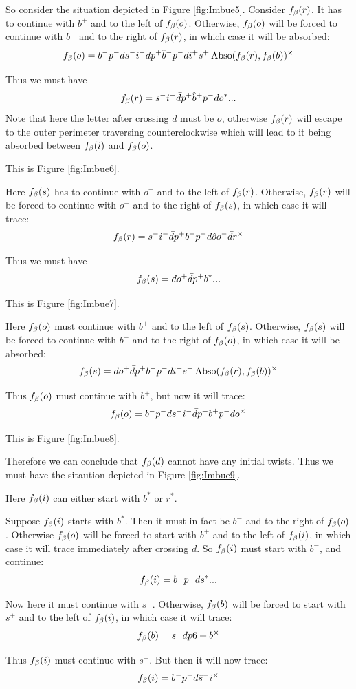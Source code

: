 So consider the situation depicted in Figure \ref{fig:Imbue5}. Consider $f_\beta(r)$. It has to continue with $b^+$ and to the left of $f_\beta(o)$. Otherwise, $f_\beta(o)$ will be forced to continue with $b^-$ and to the right of $f_\beta(r)$, in which case it will be absorbed:
\[
f_\beta(o) = b^- p^- d s^- i^-\bar{d} p^+ \hat{b}^- p^- d i^+ s^+ \operatorname{Abso}(f_\beta(r), f_\beta(b))^\times
\]

Thus we must have
\[
f_\beta(r) = s^- i^- \bar{d} p^+ \hat{b}^+ p^- d o^*...
\]
Note that here the letter after crossing $d$ must be $o$, otherwise $f_\beta(r)$ will escape to the outer perimeter traversing counterclockwise which will lead to it being absorbed between $f_\beta(i)$ and $f_\beta(o)$.

This is Figure \ref{fig:Imbue6}.

Here $f_\beta(s)$ has to continue with $o^+$ and to the left of $f_\beta(r)$. Otherwise, $f_\beta(r)$ will be forced to continue with $o^-$ and to the right of $f_\beta(s)$, in which case it will trace:
\[
f_\beta(r) = s^- i^- \bar{d} p^+ b^+ p^- d \hat{o}{o}^- \bar{d} r^\times
\]

Thus we must have
\[
f_\beta(s) = d o^+ \bar{d} p^+ b^*...
\]

This is Figure \ref{fig:Imbue7}.

Here $f_\beta(o)$ must continue with $b^+$ and to the left of $f_\beta(s)$. Otherwise, $f_\beta(s)$ will be forced to continue with $b^-$ and to the right of $f_\beta(o)$, in which case it will be absorbed:
\[
f_\beta(s) = d o^+ \bar{d} p^+ b^- p^- d i^+ s^+ \operatorname{Abso}(f_\beta(r), f_\beta(b))^\times
\]

Thus $f_\beta(o)$ must continue with $b^+$, but now it will trace:
\[
f_\beta(o) = b^- p^- d s^- i^- \bar{d} p^+ b^+ p^- d o^\times
\]

This is Figure \ref{fig:Imbue8}.

Therefore we can conclude that $f_\beta(\bar{d})$ cannot have any initial twists. Thus we must have the sitaution depicted in Figure \ref{fig:Imbue9}.

Here $f_\beta(i)$ can either start with $b^*$ or $r^*$.

Suppose $f_\beta(i)$ starts with $b^*$. Then it must in fact be $b^-$ and to the right of $f_\beta(o)$. Otherwise $f_\beta(o)$ will be forced to start with $b^+$ and to the left of $f_\beta(i)$, in which case it will trace immediately after crossing $d$. So $f_\beta(i)$ must start with $b^-$, and continue:
\[
f_\beta(i) = b^- p^- d s^*...
\]

Now here it must continue with $s^-$. Otherwise, $f_\beta(b)$ will be forced to start with $s^+$ and to the left of $f_\beta(i)$, in which case it will trace:
\[
f_\beta(b) = s^+ \bar{d} p6+ b^\times
\]

Thus $f_\beta(i)$ must continue with $s^-$. But then it will now trace:
\[
f_\beta(i) = b^- p^- d \hat{s}^- i^\times
\]

